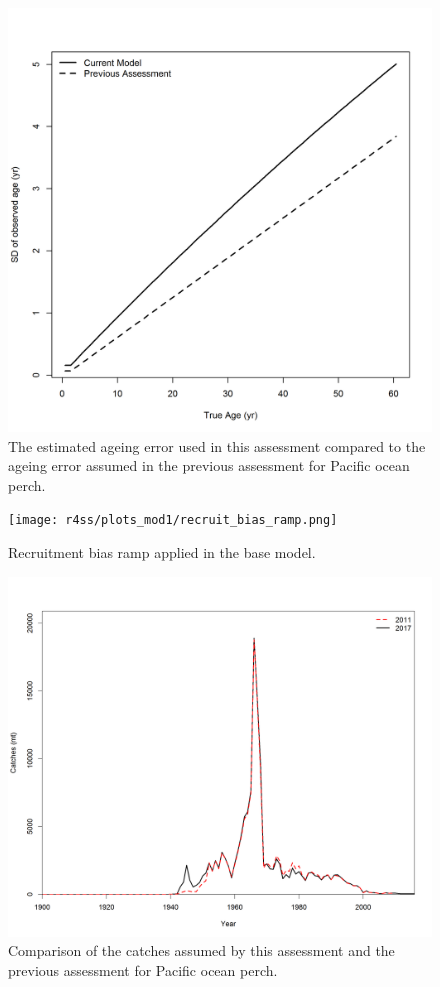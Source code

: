 \documentclass[12pt,]{article}
\begin{document}
\FloatBarrier 

\begin{figure}
\centering
\includegraphics{Figures/Ageing_Error.png}
\caption{The estimated ageing error used in this assessment compared to
the ageing error assumed in the previous assessment for Pacific ocean
perch. \label{fig:Age_Error}}
\end{figure}

\FloatBarrier 

\begin{figure}
\centering
\texttt{[image: r4ss/plots\_mod1/recruit\_bias\_ramp.png]}
\caption{Recruitment bias ramp applied in the base model.
\label{fig:bias_ramp}}
\end{figure}

\begin{figure}
\centering
\includegraphics{Figures/Catch_Comparison.png}
\caption{Comparison of the catches assumed by this assessment and the
previous assessment for Pacific ocean perch. \label{fig:Catch_Compare}}
\end{figure}
\end{document}
